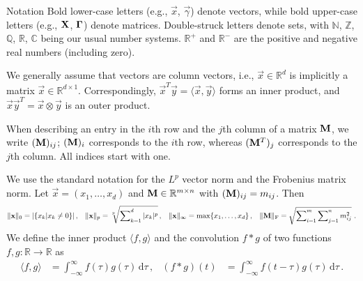 \begin{FloatingBox}{Notation}
\setlength{\parskip}{0.5em}
Bold lower-case letters (e.g., $\vec x$, $\vec \gamma$) denote vectors, while bold upper-case letters (e.g., $\mathbf{X}$, $\mathbf{\Gamma}$) denote matrices.
Double-struck letters denote sets, with $\mathbb{N}$, $\mathbb{Z}$, $\mathbb{Q}$, $\mathbb{R}$, $\mathbb{C}$ being our usual number systems.
$\mathbb{R}^+$ and $\mathbb{R}^-$ are the positive and negative real numbers (including zero).

We generally assume that vectors are column vectors, i.e., $\vec x \in \mathbb{R}^d$ is implicitly a matrix $\vec x \in \mathbb{R}^{d \times 1}$.
Correspondingly, $\vec x^T \vec y =  \langle \vec x, \vec y \rangle$ forms an inner product, and $\vec x \vec y^T = \vec x \otimes \vec y$ is an outer product.

When describing an entry in the $i$th row and the $j$th column of a matrix $\mathbf{M}$, we write $( \mathbf{M} )_{ij}$; $(\mathbf{M})_i$ corresponds to the $i$th row, whereas $(\mathbf{M}^T)_j$ corresponds to the $j$th column.
All indices start with one.

We use the standard notation for the $L^p$ vector norm and the Frobenius matrix norm. Let $\vec x = (x_1, \ldots, x_d)$ and $\mathbf{M} \in \mathbb{R}^{m \times n}$ with $(\mathbf{M})_{ij} = m_{ij}$. Then
\begin{align*}
	\|\mathbf{x}\|_0 &= | \{ x_k | x_k \neq 0 \} | \,, & 
	\|\mathbf{x}\|_p &= \sqrt[p\,\,]{\sum\nolimits_{k=1}^d |x_k|^p } \,, &
	\|\mathbf{x}\|_\infty &= \max\{ x_1, \ldots, x_d\} \,, &
	\| \mathbf{M} \|_\mathrm{F} = \sqrt{\sum\nolimits_{i=1}^m \sum\nolimits_{j=1}^n m_{ij}^2} \,\,.
\end{align*}
We define the inner product $\langle f, g \rangle$ and the convolution $f \ast g$ of two functions $f, g : \mathbb{R} \longrightarrow \mathbb{R}$ as
\begin{align*}
	\langle f, g \rangle &= \int_{-\infty}^\infty f(\tau) g(\tau) \,\mathrm{d}{\tau} \,, & 
	(f \ast g)(t) &= \int_{-\infty}^\infty f(t - \tau) g(\tau) \,\mathrm{d}{\tau} \,.
\end{align*}
\end{FloatingBox}
